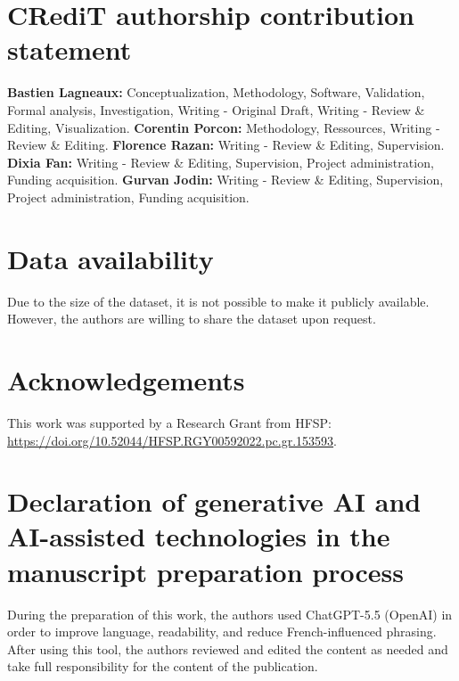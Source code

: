 \documentclass[preprint,12pt]{elsarticle}
\begin{document}
\section*{CRediT authorship contribution statement}
\textbf{Bastien Lagneaux:} Conceptualization, Methodology, Software, Validation, Formal analysis, Investigation, Writing - Original Draft, Writing - Review \& Editing, Visualization.
\textbf{Corentin Porcon:} Methodology, Ressources, Writing - Review \& Editing.
\textbf{Florence Razan:} Writing - Review \& Editing, Supervision.
\textbf{Dixia Fan:} Writing - Review \& Editing, Supervision, Project administration, Funding acquisition.
\textbf{Gurvan Jodin:} Writing - Review \& Editing, Supervision, Project administration, Funding acquisition.

\section*{Data availability}
Due to the size of the dataset, it is not possible to make it publicly available. However, the authors are willing to share the dataset upon request.

\section*{Acknowledgements}
This work was supported by a Research Grant from HFSP: \url{https://doi.org/10.52044/HFSP.RGY00592022.pc.gr.153593}.

\section*{Declaration of generative AI and AI-assisted technologies in the manuscript preparation process}
During the preparation of this work, the authors used ChatGPT-5.5 (OpenAI) in order to improve language, readability, and reduce French-influenced phrasing. After using this tool, the authors reviewed and edited the content as needed and take full responsibility for the content of the publication.



\end{document}
